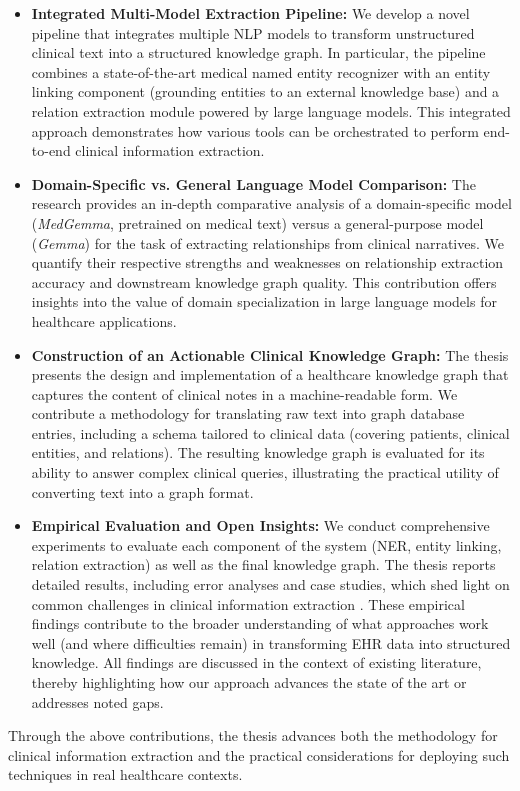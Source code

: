 \begin{itemize}
\item \textbf{Integrated Multi-Model Extraction Pipeline:} We develop a novel pipeline that integrates multiple NLP models to transform unstructured clinical text into a structured knowledge graph. In particular, the pipeline combines a state-of-the-art medical named entity recognizer with an entity linking component (grounding entities to an external knowledge base) and a relation extraction module powered by large language models. This integrated approach demonstrates how various tools can be orchestrated to perform end-to-end clinical information extraction.

\item \textbf{Domain-Specific vs. General Language Model Comparison:} The research provides an in-depth comparative analysis of a domain-specific model (\emph{MedGemma}, pretrained on medical text) versus a general-purpose model (\emph{Gemma}) for the task of extracting relationships from clinical narratives. We quantify their respective strengths and weaknesses on relationship extraction accuracy and downstream knowledge graph quality. This contribution offers insights into the value of domain specialization in large language models for healthcare applications.

\item \textbf{Construction of an Actionable Clinical Knowledge Graph:} The thesis presents the design and implementation of a healthcare knowledge graph that captures the content of clinical notes in a machine-readable form. We contribute a methodology for translating raw text into graph database entries, including a schema tailored to clinical data (covering patients, clinical entities, and relations). The resulting knowledge graph is evaluated for its ability to answer complex clinical queries, illustrating the practical utility of converting text into a graph format.

\item \textbf{Empirical Evaluation and Open Insights:} We conduct comprehensive experiments to evaluate each component of the system (NER, entity linking, relation extraction) as well as the final knowledge graph. The thesis reports detailed results, including error analyses and case studies, which shed light on common challenges in clinical information extraction \parencite{Hier2025}. These empirical findings contribute to the broader understanding of what approaches work well (and where difficulties remain) in transforming EHR data into structured knowledge. All findings are discussed in the context of existing literature, thereby highlighting how our approach advances the state of the art or addresses noted gaps.
\end{itemize}

Through the above contributions, the thesis advances both the methodology for clinical information extraction and the practical considerations for deploying such techniques in real healthcare contexts.